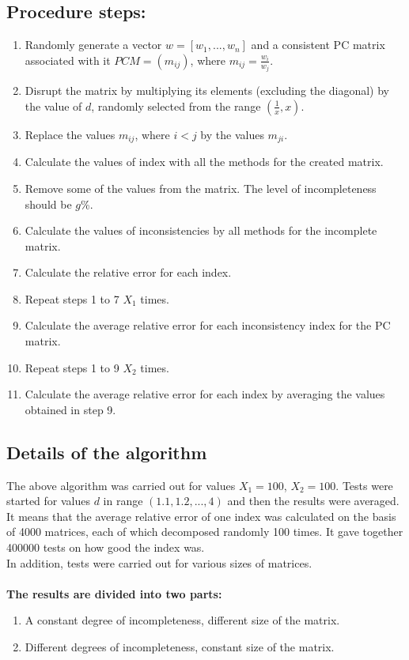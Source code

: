 \subsection{Procedure steps:}
\begin{enumerate}
\item Randomly generate a vector $w=[w_{1},...,w_{n}]$ and a consistent PC matrix associated with it $PCM=\left(m_{ij}\right)$, where $m_{ij}=\frac{w_{i}}{w_{j}}$.
\item Disrupt the matrix by multiplying its elements (excluding the diagonal) by the value of $d$, randomly selected from the range $\left(\frac{1}{x},x\right)$.

\item Replace the values $m_{ij}$, where $i<j$ by the values $m_{ji}$.

\item Calculate the values of index with all the methods for the created matrix.

\item Remove some of the values from the matrix. The level of incompleteness should be $g$\%.

\item Calculate the values of inconsistencies by all methods for the incomplete matrix.

\item Calculate the relative error for each index.

\item Repeat steps 1 to 7 $X_{1}$ times.

\item Calculate the average relative error for each inconsistency index for the PC matrix.

\item Repeat steps 1 to 9 $X_{2}$ times.

\item Calculate the average relative error for each index by averaging the values obtained in step 9.

\end{enumerate}


\subsection{Details of the algorithm}
The above algorithm was carried out for values $X_{1}=100$, $X_{2}=100$. Tests were started for values $d$ in range $\left(1.1,1.2,...,4\right)$ and then the results were averaged. It means that the average relative error of one index was calculated on the basis of 4000 matrices, each of which decomposed randomly 100 times. It gave together 400000 tests on how good the index was. 
\\
In addition, tests were carried out for various sizes of matrices.
\\
\\
\textbf{The results are divided into two parts:}
\begin{enumerate}
  \item A constant degree of incompleteness, different size of the matrix.
  \item Different degrees of incompleteness, constant size of the matrix.
\end{enumerate}

